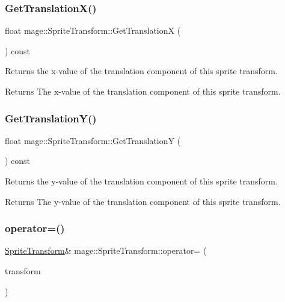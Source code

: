 \subsubsection{\texorpdfstring{Get\+Translation\+X()}{GetTranslationX()}}
{\footnotesize\ttfamily float mage\+::\+Sprite\+Transform\+::\+Get\+TranslationX (\begin{DoxyParamCaption}{ }\end{DoxyParamCaption}) const}

Returns the x-\/value of the translation component of this sprite transform.

\begin{DoxyReturn}{Returns}
The x-\/value of the translation component of this sprite transform. 
\end{DoxyReturn}
\hypertarget{structmage_1_1_sprite_transform_a7cf25b0261f0fd65339a9c3e119e2573}{}\label{structmage_1_1_sprite_transform_a7cf25b0261f0fd65339a9c3e119e2573} 
\subsubsection{\texorpdfstring{Get\+Translation\+Y()}{GetTranslationY()}}
{\footnotesize\ttfamily float mage\+::\+Sprite\+Transform\+::\+Get\+TranslationY (\begin{DoxyParamCaption}{ }\end{DoxyParamCaption}) const}

Returns the y-\/value of the translation component of this sprite transform.

\begin{DoxyReturn}{Returns}
The y-\/value of the translation component of this sprite transform. 
\end{DoxyReturn}
\hypertarget{structmage_1_1_sprite_transform_af0adccff92d48e7b347e66277981ee07}{}\label{structmage_1_1_sprite_transform_af0adccff92d48e7b347e66277981ee07} 
\subsubsection{\texorpdfstring{operator=()}{operator=()}\hspace{0.1cm}{\footnotesize\ttfamily [1/2]}}
{\footnotesize\ttfamily \hyperlink{structmage_1_1_sprite_transform}{Sprite\+Transform}\& mage\+::\+Sprite\+Transform\+::operator= (\begin{DoxyParamCaption}\item[{const \hyperlink{structmage_1_1_sprite_transform}{Sprite\+Transform} \&}]{transform }\end{DoxyParamCaption})\hspace{0.3cm}{\ttfamily [default]}}

